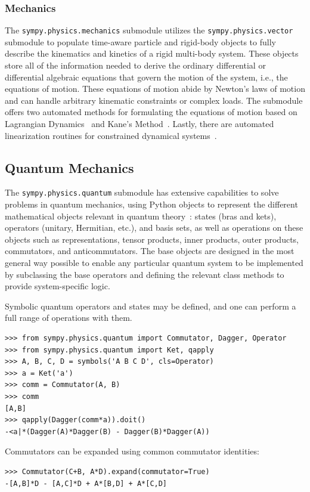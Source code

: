 \subsubsection{Mechanics}

The \verb|sympy.physics.mechanics| submodule utilizes the \texttt{sympy.\allowbreak{}physics.\allowbreak{}vector} submodule
to populate time-aware particle and rigid-body objects to fully describe the
kinematics and kinetics of a rigid multi-body system. These objects store all
of the information needed to derive the ordinary differential or differential
algebraic equations that govern the motion of the system, i.e., the equations
of motion. These equations of motion abide by Newton's laws of motion and can
handle arbitrary kinematic constraints or complex loads. The submodule
offers two automated methods for formulating the equations of motion based on
Lagrangian Dynamics~\cite{Lagrange1811} and Kane's Method~\cite{Kane1985}.
Lastly, there are automated linearization routines for constrained dynamical
systems~\cite{Peterson2014}.

\subsection{Quantum Mechanics}
\label{sec:quantum}

The \verb|sympy.physics.quantum| submodule has extensive capabilities to
solve problems in quantum mechanics, using Python objects to represent the
different mathematical objects relevant in quantum theory~\cite{Sakurai2010}:
states (bras and kets), operators (unitary, Hermitian, etc.), and basis sets, as
well as operations on these objects such as representations, tensor products,
inner products, outer products, commutators, and anticommutators. The base
objects are designed in the most general way possible to enable any particular
quantum system to be implemented by subclassing the base operators and defining
the relevant class methods to provide system-specific logic.

Symbolic quantum operators and states may be defined, and one can perform
a full range of operations with them.
\begin{verbatim}
>>> from sympy.physics.quantum import Commutator, Dagger, Operator
>>> from sympy.physics.quantum import Ket, qapply
>>> A, B, C, D = symbols('A B C D', cls=Operator)
>>> a = Ket('a')
>>> comm = Commutator(A, B)
>>> comm
[A,B]
>>> qapply(Dagger(comm*a)).doit()
-<a|*(Dagger(A)*Dagger(B) - Dagger(B)*Dagger(A))
\end{verbatim}
Commutators can be expanded using common commutator identities:
\begin{verbatim}
>>> Commutator(C+B, A*D).expand(commutator=True)
-[A,B]*D - [A,C]*D + A*[B,D] + A*[C,D]
\end{verbatim}

